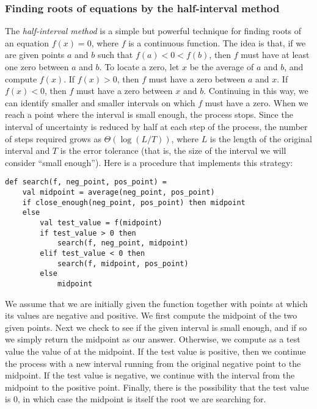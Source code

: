 \subsubsection{Finding roots of equations by the half-interval method}

The \emph{half-interval method} is a simple but powerful technique for finding roots of an equation $f(x) = 0$, where $f$ is a continuous function. The idea is that, if we are given points $a$ and $b$ such that $f(a) < 0 < f(b)$, then $f$ must have at least one zero between $a$ and $b$. To locate a zero, let $x$ be the average of $a$ and $b$, and compute $f(x)$. If $f(x) > 0$, then $f$ must have a zero between $a$ and $x$. If $f(x) < 0$, then $f$ must have a zero between $x$ and $b$. Continuing in this way, we can identify smaller and smaller intervals on which $f$ must have a zero. When we reach a point where the interval is small enough, the process stops. Since the interval of uncertainty is reduced by half at each step of the process, the number of steps required grows as $\Theta(\log(L/T))$, where $L$ is the length of the original interval and $T$ is the error tolerance (that is, the size of the interval we will consider ``small enough''). Here is a procedure that implements this strategy:

\begin{lstlisting}[style=slate]
def search(f, neg_point, pos_point) =
    val midpoint = average(neg_point, pos_point)
    if close_enough(neg_point, pos_point) then midpoint
    else
        val test_value = f(midpoint)
        if test_value > 0 then
            search(f, neg_point, midpoint)
        elif test_value < 0 then
            search(f, midpoint, pos_point)
        else
            midpoint
\end{lstlisting}

We assume that we are initially given the function  together with points at which its values are negative and positive. We first compute the midpoint of the two given points. Next we check to see if the given interval is small enough, and if so we simply return the midpoint as our answer. Otherwise, we compute as a test value the value of  at the midpoint. If the test value is positive, then we continue the process with a new interval running from the original negative point to the midpoint. If the test value is negative, we continue with the interval from the midpoint to the positive point. Finally, there is the possibility that the test value is 0, in which case the midpoint is itself the root we are searching for.

